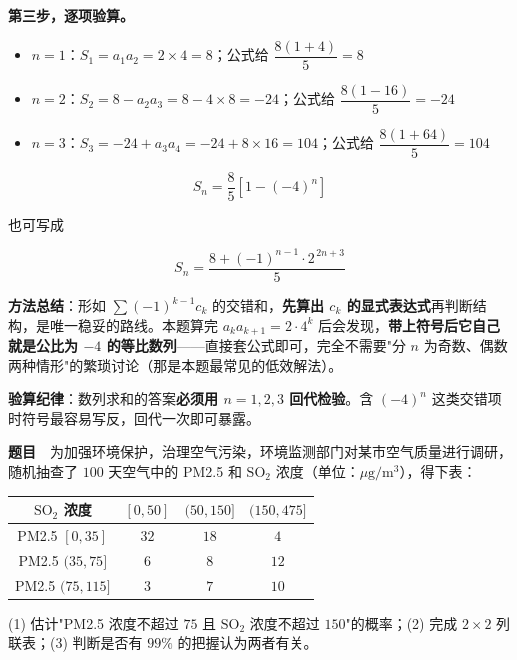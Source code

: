 \textbf{第三步，逐项验算。}

\begin{itemize}
\item $n=1$：$S_1=a_1a_2=2\times4=8$；公式给 $\dfrac{8(1+4)}5=8$ 
\item $n=2$：$S_2=8-a_2a_3=8-4\times8=-24$；公式给 $\dfrac{8(1-16)}5=-24$ 
\item $n=3$：$S_3=-24+a_3a_4=-24+8\times16=104$；公式给 $\dfrac{8(1+64)}5=104$ 
\end{itemize}

\[\boxed{S_n=\frac85\left[1-(-4)^{n}\right]}\]

也可写成

\[S_n=\frac{8+(-1)^{n-1}\cdot2^{\,2n+3}}5\]

\begin{gktip}
\textbf{方法总结}：形如 $\sum(-1)^{k-1}c_k$ 的交错和，\textbf{先算出 $c_k$ 的显式表达式}再判断结构，是唯一稳妥的路线。本题算完 $a_ka_{k+1}=2\cdot4^{k}$ 后会发现，\textbf{带上符号后它自己就是公比为 $-4$ 的等比数列}——直接套公式即可，完全不需要"分 $n$ 为奇数、偶数两种情形"的繁琐讨论（那是本题最常见的低效解法）。

\textbf{验算纪律}：数列求和的答案\textbf{必须用 $n=1,2,3$ 回代检验}。含 $(-4)^{n}$ 这类交错项时符号最容易写反，回代一次即可暴露。
\end{gktip}

\par\medskip


\textbf{题目}　为加强环境保护，治理空气污染，环境监测部门对某市空气质量进行调研，随机抽查了 $100$ 天空气中的 PM2.5 和 $\mathrm{SO_2}$ 浓度（单位：$\mu\mathrm g/\mathrm m^{3}$），得下表：

\begin{center}
\begin{tabular}{cccc}
\toprule
$\mathrm{SO_2}$ 浓度 & $[0,50]$ & $(50,150]$ & $(150,475]$ \\
\midrule
PM2.5 $[0,35]$ & $32$ & $18$ & $4$ \\
PM2.5 $(35,75]$ & $6$ & $8$ & $12$ \\
PM2.5 $(75,115]$ & $3$ & $7$ & $10$ \\
\bottomrule
\end{tabular}
\end{center}

  (1) 估计"PM2.5 浓度不超过 $75$ 且 $\mathrm{SO_2}$ 浓度不超过 $150$"的概率；(2) 完成 $2\times2$ 列联表；(3) 判断是否有 $99\%$ 的把握认为两者有关。

